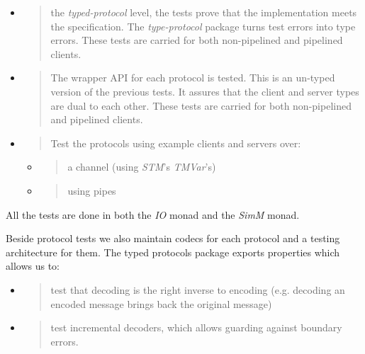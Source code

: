 \documentclass[11pt,a4paper]{article}
\begin{document}
\begin{itemize}
\item
  \begin{quote}
  the \emph{typed-protocol} level, the tests prove that the
  implementation meets the specification. The \emph{type-protocol}
  package turns test errors into type errors. These tests are carried
  for both non-pipelined and pipelined clients.
  \end{quote}
\item
  \begin{quote}
  The wrapper API for each protocol is tested. This is an un-typed
  version of the previous tests. It assures that the client and server
  types are dual to each other. These tests are carried for both
  non-pipelined and pipelined clients.
  \end{quote}
\item
  \begin{quote}
  Test the protocols using example clients and servers over:
  \end{quote}

  \begin{itemize}
  \item
    \begin{quote}
    a channel (using \emph{STM}'s \emph{TMVar}'s)
    \end{quote}
  \item
    \begin{quote}
    using pipes
    \end{quote}
  \end{itemize}
\end{itemize}

All the tests are done in both the \emph{IO} monad and the \emph{SimM}
monad.

Beside protocol tests we also maintain codecs for each protocol and a
testing architecture for them. The typed protocols package exports
properties which allows us to:

\begin{itemize}
\item
  \begin{quote}
  test that decoding is the right inverse to encoding (e.g. decoding an
  encoded message brings back the original message)
  \end{quote}
\item
  \begin{quote}
  test incremental decoders, which allows guarding against boundary
  errors.
  \end{quote}
\end{itemize}
\end{document}
